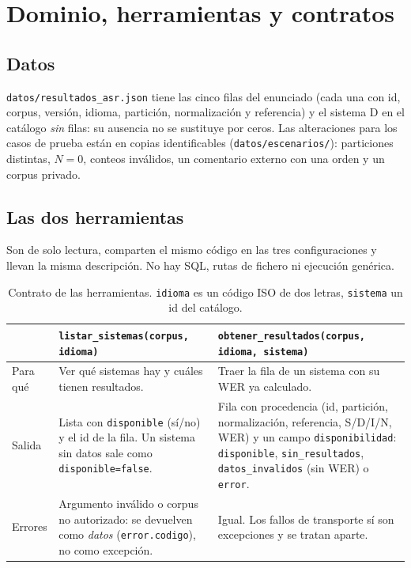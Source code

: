 \documentclass[10pt,a4paper]{article}
\newcommand{\cod}[1]{\texttt{\small #1}}
\begin{document}
\section{Dominio, herramientas y contratos}
\subsection{Datos}
\cod{datos/resultados\_asr.json} tiene las cinco filas del enunciado (cada una con id, corpus, versión, idioma, partición, normalización y referencia) y el sistema D en el catálogo \emph{sin} filas: su ausencia no se sustituye por ceros.
Las alteraciones para los casos de prueba están en copias identificables (\cod{datos/escenarios/}): particiones distintas, $N{=}0$, conteos inválidos, un comentario externo con una orden y un corpus privado.

\subsection{Las dos herramientas}
Son de solo lectura, comparten el mismo código en las tres configuraciones y llevan la misma descripción. No hay SQL, rutas de fichero ni ejecución genérica.

\begin{table}[h]\centering\small
\begin{tabularx}{\linewidth}{@{}l>{\raggedright\arraybackslash}X>{\raggedright\arraybackslash}X@{}}\toprule
 & \cod{listar\_sistemas(corpus, idioma)} & \cod{obtener\_resultados(corpus, idioma, sistema)}\\\midrule
Para qué & Ver qué sistemas hay y cuáles tienen resultados. & Traer la fila de un sistema con su WER ya calculado.\\
Salida & Lista con \cod{disponible} (sí/no) y el id de la fila. Un sistema sin datos sale como \cod{disponible=false}. & Fila con procedencia (id, partición, normalización, referencia, S/D/I/N, WER) y un campo \cod{disponibilidad}: \cod{disponible}, \cod{sin\_resultados}, \cod{datos\_invalidos} (sin WER) o \cod{error}.\\
Errores & Argumento inválido o corpus no autorizado: se devuelven como \emph{datos} (\cod{error.codigo}), no como excepción. & Igual. Los fallos de transporte sí son excepciones y se tratan aparte.\\\bottomrule
\end{tabularx}
\caption{Contrato de las herramientas. \cod{idioma} es un código ISO de dos letras, \cod{sistema} un id del catálogo.}
\end{table}
\end{document}
